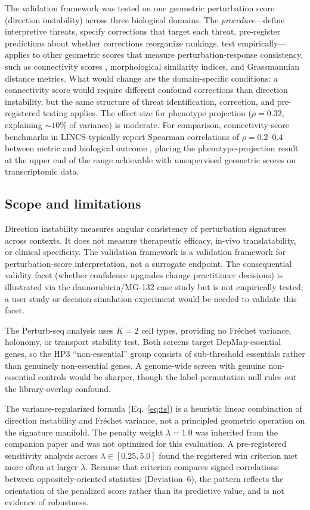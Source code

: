 \documentclass[11pt]{article}
\begin{document}
The validation framework was tested on one geometric perturbation score
(direction instability) across three biological domains. The
\emph{procedure}---define interpretive threats, specify corrections
that target each threat, pre-register predictions about whether
corrections reorganize rankings, test empirically---applies to other
geometric scores that measure perturbation-response consistency, such as
connectivity scores \citep{subramanian2017next}, morphological similarity
indices, and Grassmannian distance metrics. What would change are the
domain-specific conditions: a connectivity score would require different
confound corrections than direction instability, but the same
structure of threat identification, correction, and pre-registered
testing applies. The effect size for phenotype projection ($\rho = 0.32$,
explaining ${\sim}10\%$ of variance) is moderate. For comparison,
connectivity-score benchmarks in LINCS typically report Spearman
correlations of $\rho = 0.2$--$0.4$ between metric and biological
outcome \citep{li2020comprehensive}, placing the phenotype-projection
result at the upper end of the range achievable with unsupervised
geometric scores on transcriptomic data.

\subsection{Scope and limitations}
\label{sec:limitations}

Direction instability measures angular consistency of perturbation signatures
across contexts. It does not measure therapeutic efficacy, in-vivo
translatability, or clinical specificity. The validation framework is a
validation framework for perturbation-score interpretation, not a surrogate
endpoint. The consequential validity facet (whether confidence upgrades
change practitioner decisions) is illustrated via the daunorubicin/MG-132
case study but is not empirically tested; a user study or
decision-simulation experiment would be needed to validate this facet.

The Perturb-seq analysis uses $K = 2$ cell types, providing no Fr\'echet
variance, holonomy, or transport stability test. Both screens target
DepMap-essential genes, so the HP3 ``non-essential'' group consists of
sub-threshold essentials rather than genuinely non-essential genes. A
genome-wide screen with genuine non-essential controls would be sharper,
though the label-permutation null rules out the library-overlap confound.

The variance-regularized formula (Eq.~\ref{eq:ts}) is a heuristic
linear combination of direction instability and Fr\'echet variance, not a
principled geometric operation on the signature manifold. The penalty
weight $\lambda = 1.0$ was inherited from the companion paper
\citep{tower2026drug} and was not optimized for this evaluation. A pre-registered sensitivity
analysis across $\lambda \in [0.25, 5.0]$ found the registered win
criterion met more often at larger $\lambda$. Because that criterion
compares signed correlations between oppositely-oriented statistics
(Deviation~6), the pattern reflects the orientation of the penalized score
rather than its predictive value, and is not evidence of robustness.
\end{document}
